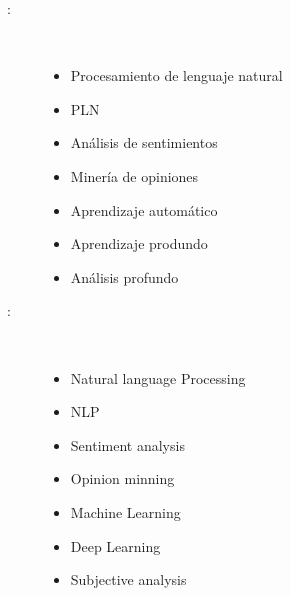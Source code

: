 \begin{multicols}{2}
\begin{description}
\item [\palabraschaveprincipal:] \mbox{} \\[-20pt]
  \begin{itemize}
  	\item Procesamiento de lenguaje natural
  	\item PLN
  	\item Análisis de sentimientos
  	\item Minería de opiniones
  	\item Aprendizaje automático
  	\item Aprendizaje produndo
  	\item Análisis profundo
  \end{itemize}
\end{description}
\begin{description}
\item [\palabraschavesecundaria:] \mbox{} \\[-20pt]
  \begin{itemize}
  	\item Natural language Processing
  	\item NLP
  	\item Sentiment analysis
  	\item Opinion minning
  	\item Machine Learning
  	\item Deep Learning
  	\item Subjective analysis
  \end{itemize}
\end{description}
\end{multicols}
